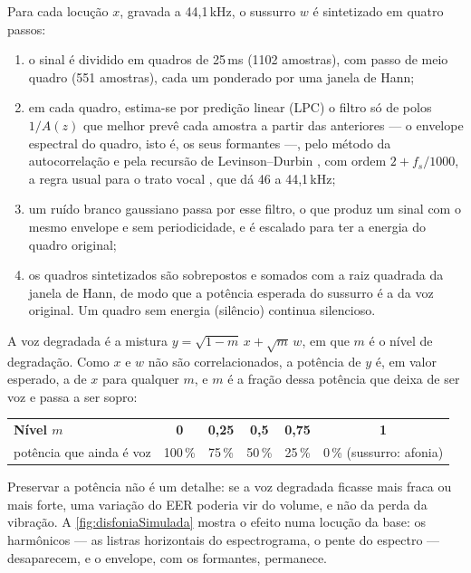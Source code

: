 				\par Para cada locução $x$, gravada a 44,1\,kHz, o sussurro $w$ é sintetizado em quatro passos:
				\begin{enumerate}
					\item o sinal é dividido em quadros de 25\,ms (1102 amostras), com passo de meio quadro (551 amostras), cada um ponderado por uma janela de Hann;
					\item em cada quadro, estima-se por predição linear (\ac{LPC}) o filtro só de polos $1/A(z)$ que melhor prevê cada amostra a partir das anteriores --- o envelope espectral do quadro, isto é, os seus formantes ---, pelo método da autocorrelação e pela recursão de Levinson--Durbin \cite{makhoul1975linear}, com ordem $2 + f_s/1000$, a regra usual para o trato vocal \cite{rabiner2011theory}, que dá 46 a 44,1\,kHz;
					\item um ruído branco gaussiano passa por esse filtro, o que produz um sinal com o mesmo envelope e sem periodicidade, e é escalado para ter a energia do quadro original;
					\item os quadros sintetizados são sobrepostos e somados com a raiz quadrada da janela de Hann, de modo que a potência esperada do sussurro é a da voz original. Um quadro sem energia (silêncio) continua silencioso.
				\end{enumerate}

				\par A voz degradada é a mistura $y = \sqrt{1-m}\,x + \sqrt{m}\,w$, em que $m$ é o nível de degradação. Como $x$ e $w$ não são correlacionados, a potência de $y$ é, em valor esperado, a de $x$ para qualquer $m$, e $m$ é a fração dessa potência que deixa de ser voz e passa a ser sopro:
				\begin{center}
					\begin{tabular}{@{}lccccc@{}}
						\tableHeaderRow \textbf{Nível $m$} & \textbf{0} & \textbf{0,25} & \textbf{0,5} & \textbf{0,75} & \textbf{1} \\
						potência que ainda é voz & 100\,\% & 75\,\% & 50\,\% & 25\,\% & 0\,\% (sussurro: afonia) \\
						\bottomrule
					\end{tabular}
				\end{center}
				Preservar a potência não é um detalhe: se a voz degradada ficasse mais fraca ou mais forte, uma variação do \ac{EER} poderia vir do volume, e não da perda da vibração. A \autoref{fig:disfoniaSimulada} mostra o efeito numa locução da base: os harmônicos --- as listras horizontais do espectrograma, o pente do espectro --- desaparecem, e o envelope, com os formantes, permanece.

